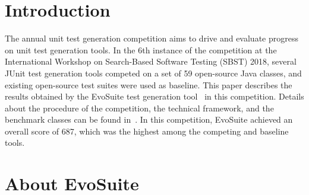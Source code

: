 \documentclass[sigconf,table]{acmart}
\newcommand{\TODO}[1]{\textbf{\textcolor{ScarletRed}{[TODO: #1]}}\xspace}
\newcommand{\TODO}[1]{}
\newcommand{\EVOSUITE}{{\sc EvoSuite}\xspace}
\newcommand{\JTEXPERT}{{\sc jTExpert}\xspace}
\newcommand{\RANDOOP}{{\sc Randoop}\xspace}
\newcommand{\TT}{{\sc T3}\xspace}
\newcommand{\TOTALPOINTS}{{687}\xspace}
\begin{document}
\maketitle

\section{Introduction}
The annual unit test generation competition aims to drive and evaluate
progress on unit test generation tools. In the 6th instance of the
competition at the International Workshop on Search-Based Software
Testing (SBST) 2018, several JUnit test generation tools
competed on a set of 59 open-source Java classes, and 
existing open-source test suites were used as
baseline. This paper describes the results obtained by the \EVOSUITE
test generation tool~\cite{FrA11c} in this competition. Details about
the procedure of the competition, the technical framework, and the
benchmark classes can be found in~\cite{sbst18competition}.  In this
competition, \EVOSUITE achieved an overall score of \TOTALPOINTS,
which was the highest among the competing and baseline
tools.

\section{About EvoSuite}
\end{document}
